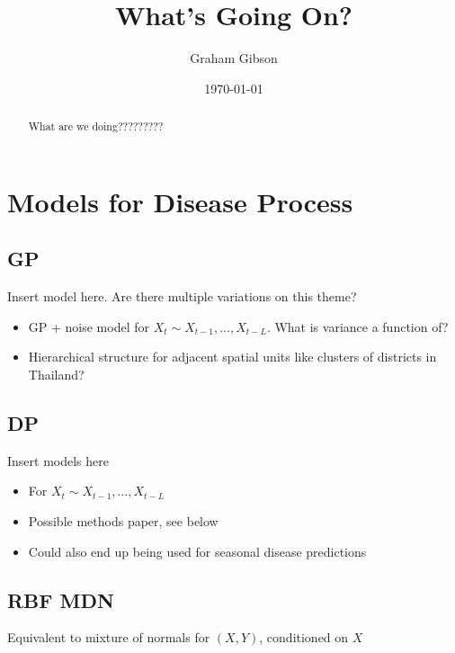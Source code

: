\documentclass{article}
\begin{document}
\title{What's Going On?}
\author{Graham Gibson}
\date{\today}
\maketitle

\begin{abstract}
    What are we doing?????????
\end{abstract}

\tableofcontents

\section{Models for Disease Process}

\subsection{GP}

Insert model here.  Are there multiple variations on this theme?

\begin{itemize}
\item GP + noise model for $X_t \sim X_{t - 1}, \ldots, X_{t - L}$.  What is variance a function of?
\item Hierarchical structure for adjacent spatial units like clusters of districts in Thailand?
\end{itemize}

\subsection{DP}

Insert models here

\begin{itemize}
\item For $X_t \sim X_{t - 1}, \ldots, X_{t - L}$
\item Possible methods paper, see below
\item Could also end up being used for seasonal disease predictions
\end{itemize}


\subsection{RBF MDN}

Equivalent to mixture of normals for $(X, Y)$, conditioned on $X$
\end{document}
